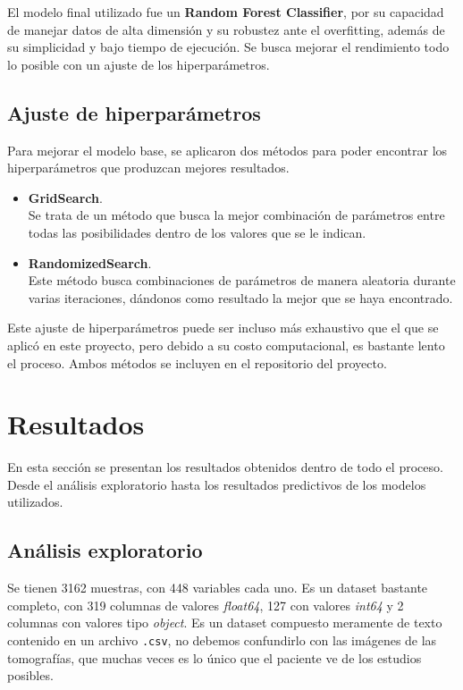 \documentclass{replab}
\begin{document}
El modelo final utilizado fue un \textbf{Random Forest Classifier}, por su capacidad de manejar datos de alta dimensión y su robustez ante el overfitting, además de su simplicidad y bajo tiempo de ejecución. Se busca mejorar el rendimiento todo lo posible con un ajuste de los hiperparámetros.

\subsection{Ajuste de hiperparámetros}

Para mejorar el modelo base, se aplicaron dos métodos para poder encontrar los hiperparámetros que produzcan mejores resultados.

\begin{itemize}[itemsep=-2pt]
    \item \textbf{GridSearch}.\\ Se trata de un método que busca la mejor combinación de parámetros entre todas las posibilidades dentro de los valores que se le indican.
    \item \textbf{RandomizedSearch}.\\ Este método busca combinaciones de parámetros de manera aleatoria durante varias iteraciones, dándonos como resultado la mejor que se haya encontrado.
\end{itemize}

Este ajuste de hiperparámetros puede ser incluso más exhaustivo que el que se aplicó en este proyecto, pero debido a su costo computacional, es bastante lento el proceso. Ambos métodos se incluyen en el repositorio del proyecto.

\section{Resultados}

En esta sección se presentan los resultados obtenidos dentro de todo el proceso. Desde el análisis exploratorio hasta los resultados predictivos de los modelos utilizados.

\subsection{Análisis exploratorio}

Se tienen 3162 muestras, con 448 variables cada uno. Es un dataset bastante completo, con 319 columnas de valores \textit{float64}, 127 con valores \textit{int64} y 2 columnas con valores tipo \textit{object}. Es un dataset compuesto meramente de texto contenido en un archivo \texttt{.csv}, no debemos confundirlo con las imágenes de las tomografías, que muchas veces es lo único que el paciente ve de los estudios posibles.
\end{document}
